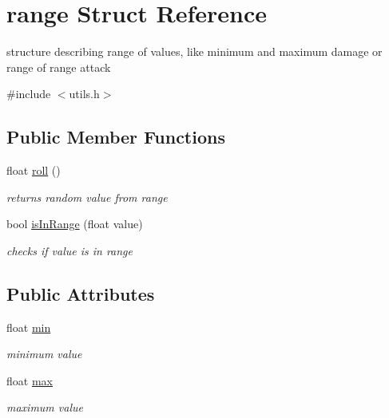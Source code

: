 \hypertarget{structrange}{}\section{range Struct Reference}
\label{structrange}


structure describing range of values, like minimum and maximum damage or range of range attack  




{\ttfamily \#include $<$utils.\+h$>$}

\subsection*{Public Member Functions}
\begin{DoxyCompactItemize}
\item 
float \hyperlink{structrange_afef0daf40d07706db0ea52cea528b56d}{roll} ()\hypertarget{structrange_afef0daf40d07706db0ea52cea528b56d}{}\label{structrange_afef0daf40d07706db0ea52cea528b56d}

\begin{DoxyCompactList}\small\item\em returns random value from range \end{DoxyCompactList}\item 
bool \hyperlink{structrange_a555d2543f5bc07721f2bd786f76a143c}{is\+In\+Range} (float value)\hypertarget{structrange_a555d2543f5bc07721f2bd786f76a143c}{}\label{structrange_a555d2543f5bc07721f2bd786f76a143c}

\begin{DoxyCompactList}\small\item\em checks if value is in range \end{DoxyCompactList}\end{DoxyCompactItemize}
\subsection*{Public Attributes}
\begin{DoxyCompactItemize}
\item 
float \hyperlink{structrange_a46badf2adb5cef3360f12a1dd1c6f081}{min}\hypertarget{structrange_a46badf2adb5cef3360f12a1dd1c6f081}{}\label{structrange_a46badf2adb5cef3360f12a1dd1c6f081}

\begin{DoxyCompactList}\small\item\em minimum value \end{DoxyCompactList}\item 
float \hyperlink{structrange_a05e610bf5a8cc81f33c93be5654e02d6}{max}\hypertarget{structrange_a05e610bf5a8cc81f33c93be5654e02d6}{}\label{structrange_a05e610bf5a8cc81f33c93be5654e02d6}

\begin{DoxyCompactList}\small\item\em maximum value \end{DoxyCompactList}\end{DoxyCompactItemize}


